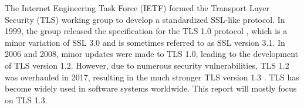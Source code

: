 The Internet Engineering Task Force (IETF) formed the Transport Layer Security (TLS) working group to develop a standardized SSL-like protocol. In 1999, the group released the specification for the TLS 1.0 protocol \cite{rfc793}, which is a minor variation of SSL 3.0 and is sometimes referred to as SSL version 3.1. In 2006 and 2008, minor updates were made to TLS 1.0, leading to the development of TLS version 1.2. However, due to numerous security vulnerabilities, TLS 1.2 was overhauled in 2017, resulting in the much stronger TLS version 1.3 \cite{rfc8446}. TLS has become widely used in software systems worldwide. This report will mostly focus on TLS 1.3.